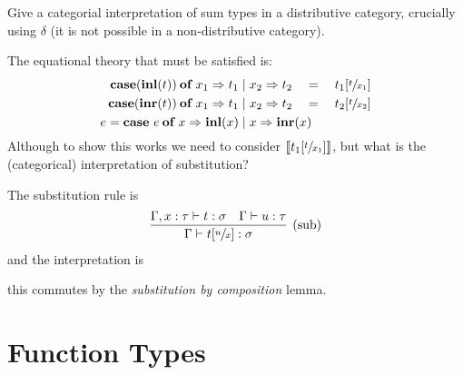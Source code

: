 \begin{exercise}
    Give a categorial interpretation of sum types in a distributive category,
    crucially using $\delta$ (it is not possible in a non-distributive
    category).
\end{exercise}

The equational theory that must be satisfied is:
\begin{align*}
    \mathbin{\text{\textbf{case}}}(\mathbin{\text{\textbf{inl}}}(t)) \mathbin{\text{\textbf{of}}} x_1 \Rightarrow t_1 &\mid x_2
    \Rightarrow t_2\quad =\quad t_1[\sfrac{t}{x_1}]
    \\
    \mathbin{\text{\textbf{case}}}(\mathbin{\text{\textbf{inr}}}(t)) \mathbin{\text{\textbf{of}}} x_1 \Rightarrow t_1 &\mid x_2
    \Rightarrow t_2\quad =\quad t_2[\sfrac{t}{x_2}]
    \\
    e = \mathbin{\text{\textbf{case}}}\ e \mathbin{\text{\textbf{of}}} x \Rightarrow \mathbin{\text{\textbf{inl}}}(x) &\mid x
    \Rightarrow \mathbin{\text{\textbf{inr}}}(x)
\end{align*}
Although to show this works we need to consider $\llbracket t_1[\sfrac{t}{x_1}]
\rrbracket$, but what is the (categorical) interpretation of substitution?

The substitution rule is
\begin{align*}
    \infer[\text{(sub)}]
    {\Gamma \vdash t[\sfrac{u}{x}] : \sigma}
    {\Gamma, x : \tau \vdash t : \sigma & \Gamma \vdash u : \tau}
\end{align*}
and the interpretation is
\begin{center}
\end{center}
this commutes by the \emph{substitution by composition} lemma.

\section{Function Types}

